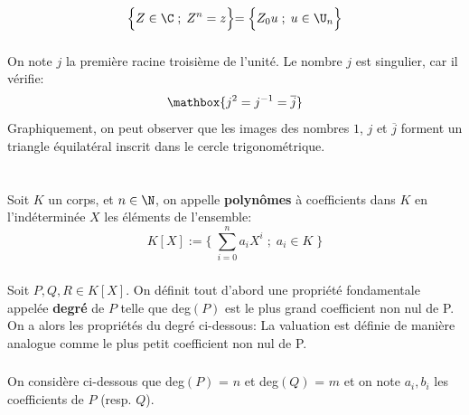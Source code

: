 \[
   \Bigl\{ Z \in \C \; ; \; Z^n = z \Bigl\} = \Bigl\{ Z_0u \; ; \; u \in \U_n \Bigl\}   
\]

\subsection*{}
On note \(j\) la première racine troisième de l'unité.
Le nombre \(j\) est singulier, car il vérifie:
\[
    \mathbox{
       j^2 = j^{-1} = \overline{j}
    }
\]
Graphiquement, on peut observer que les images des nombres \(1\), \(j\) et \(\overline{j}\) forment un triangle équilatéral inscrit dans le cercle trigonométrique.

\chapter*{} %

\subsection*{}

Soit \(K\) un corps, et \(n \in \N\), on appelle \textbf{polynômes} à coefficients dans \(K\) en l'indéterminée \(X\) les éléments de l'ensemble:
\[
   K[X] := \Biggl\{ \; \sum_{i=0}^n a_{i}X^{i} \; ; \; a_i \in K \;\Biggl\}
\]

\subsection*{}
Soit \(P, Q, R \in K[X]\).\+
On définit tout d'abord une propriété fondamentale appelée \textbf{degré} de \(P\) telle que deg\((P)\) est le plus grand coefficient non nul de P.
On a alors les propriétés du degré ci-dessous:
La valuation est définie de manière analogue comme le plus petit coefficient non nul de P.
\subsection*{}
On considère ci-dessous que deg\((P)\) = \(n\) et deg\((Q)\) = \(m\) et on note \(a_i, b_i\) les coefficients de \(P\) (resp. \(Q\)).\<

